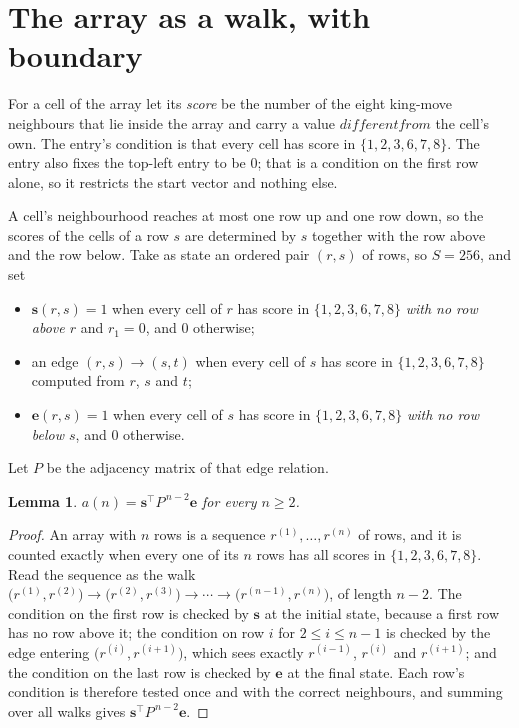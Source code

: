 \documentclass[11pt,a4paper]{article}
\theoremstyle{plain}
\newtheorem{lemma}[theorem]{Lemma}
\theoremstyle{definition}
\begin{document}
\section{The array as a walk, with boundary}

For a cell of the array let its \emph{score} be the number of the eight king-move neighbours that lie inside
the array and carry a value $different from$ the cell's own. The entry's condition is that every cell
has score in $\{1,2,3,6,7,8\}$. The entry also fixes the top-left entry to be $0$; that is a condition on the first row alone, so it restricts the start vector and nothing else.

A cell's neighbourhood reaches at most one row up and one row down, so the scores of the
cells of a row $s$ are determined by $s$ together with the row above and the row below.
Take as state an ordered pair $(r,s)$ of rows, so $S=256$, and set
\begin{itemize}
\item $\mathbf{s}(r,s)=1$ when every cell of $r$ has score in $\{1,2,3,6,7,8\}$ \emph{with no row
above $r$} and $r_1=0$, and $0$ otherwise;
\item an edge $(r,s)\to(s,t)$ when every cell of $s$ has score in $\{1,2,3,6,7,8\}$ computed from
$r$, $s$ and $t$;
\item $\mathbf{e}(r,s)=1$ when every cell of $s$ has score in $\{1,2,3,6,7,8\}$ \emph{with no row
below $s$}, and $0$ otherwise.
\end{itemize}
Let $P$ be the adjacency matrix of that edge relation.

\begin{lemma}\label{lem:walk}
$a(n)=\mathbf{s}^{\!\top}P^{\,n-2}\mathbf{e}$ for every $n\ge2$.
\end{lemma}

\begin{proof}
An array with $n$ rows is a sequence $r^{(1)},\dots,r^{(n)}$ of rows, and it is counted
exactly when every one of its $n$ rows has all scores in $\{1,2,3,6,7,8\}$. Read the sequence as the
walk $\bigl(r^{(1)},r^{(2)}\bigr)\to\bigl(r^{(2)},r^{(3)}\bigr)\to\cdots\to
\bigl(r^{(n-1)},r^{(n)}\bigr)$, of length $n-2$. The condition on the first row is
checked by $\mathbf{s}$ at the initial state, because a first row has no row above it; the
condition on row $i$ for $2\le i\le n-1$ is checked by the edge entering
$\bigl(r^{(i)},r^{(i+1)}\bigr)$, which sees exactly $r^{(i-1)}$, $r^{(i)}$ and
$r^{(i+1)}$; and the condition on the last row is checked by $\mathbf{e}$ at the final
state. Each row's condition is therefore tested once and with the correct neighbours, and
summing over all walks gives $\mathbf{s}^{\!\top}P^{\,n-2}\mathbf{e}$.
\end{proof}
\end{document}
